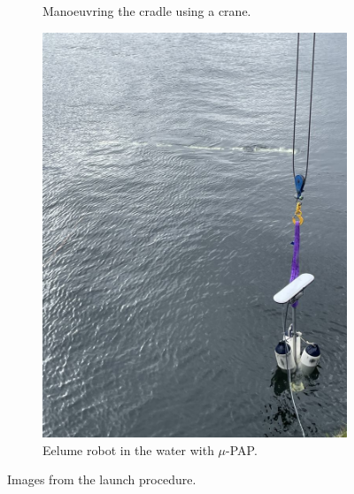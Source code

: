 \begin{figure}
\begin{subfigure}{0.26\textwidth}
        \caption{Manoeuvring the cradle using a crane.}
    \end{subfigure}
    \begin{subfigure}{0.26\textwidth}
        \centering
        \includegraphics[width=\textwidth]{assets/launch/1.jpeg}
        \caption{Eelume robot in the water with \(\mu\)-PAP.}
    \end{subfigure}
    \caption{Images from the launch procedure.}
    \label{fig:eelume:cradle-and-float}
\end{figure}






